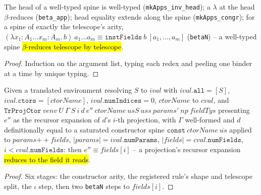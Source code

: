 \begin{lemma}
\label{family:beta-telescope}
\leanok
{}

 The head of a well-typed spine is well-typed (\texttt{mkApps\_inv\_head});
a $\lambda$ at the head $\beta$-reduces (\texttt{beta\_app}); head equality extends along
the spine (\texttt{mkApps\_congr}); for a spine of exactly the telescope's arity,
$(\lambda x_1{:}A_1 \ldots x_m{:}A_m.\,b)\ a_1 \ldots a_m \equiv
\mathtt{instFields}\ b\ [a_1,\ldots,a_m]$ (\texttt{betaN}) -- a well-typed spine
\hl{$\beta$-reduces telescope by telescope}.
\end{lemma}
\begin{proof}
\leanok
{} Induction on the argument list, typing each redex and peeling one binder at a
time by unique typing.
\end{proof}

\begin{theorem}
\label{thm:tr-env-proj-defeq}
\leanok
{}

 Given a translated environment resolving $S$ to $ival$ with
$ival.\mathtt{all} = [S]$, $ival.\mathtt{ctors} = [ctorName]$,
$ival.\mathtt{numIndices} = 0$, $ctorName$ to $cval$, and
$\mathtt{TrProjCtor}\ venv\ U\ \Gamma\ S\ i\ d\ e''\ ctorName\ usS\ uss\ params'\ np\
fieldTys$ presenting $e''$ as the recursor expansion of $d$'s $i$-th projection, with
$\Gamma$ well-formed and $d$ definitionally equal to a saturated constructor spine
$\mathtt{const}\ ctorName\ \overline{us}$ applied to $params \mathbin{+\!\!+} fields$,
$|params| = ival.\mathtt{numParams}$, $|fields| = cval.\mathtt{numFields}$,
$i < cval.\mathtt{numFields}$: then $e'' \equiv fields[i]$ -- a projection's recursor
expansion \hl{reduces to the field it reads}.
\end{theorem}
\begin{proof}
\leanok
{} Six stages: the constructor arity, the registered rule's shape and telescope
split, the $\iota$ step, then two \texttt{betaN} steps to $fields[i]$.
\end{proof}

